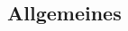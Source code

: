 \documentclass[a4paper, landscape]{article}
\title{\name}
\author{Louis Seubert}
\begin{document}
\begin{multicols}{3}
 \section{Allgemeines}
\end{multicols}
\end{document}
